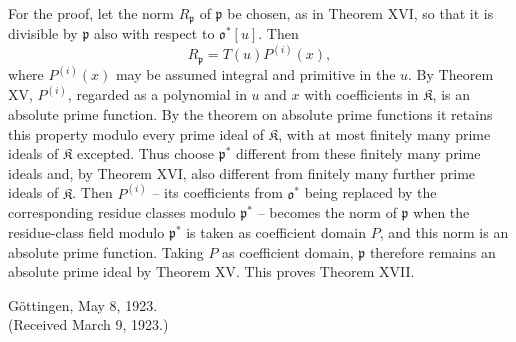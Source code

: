\documentclass[11pt]{article}
\providecommand{\frakp}{\mathfrak p}
\begin{document}
For the proof, let the norm $R_\frakp$ of $\frakp$ be chosen, as in Theorem XVI, so that it is divisible by $\frakp$ also with respect to $\mathfrak o^*[u]$. Then
\[
 R_\frakp=T(u)P^{(i)}(x),
\]
where $P^{(i)}(x)$ may be assumed integral and primitive in the $u$. By Theorem XV, $P^{(i)}$, regarded as a polynomial in $u$ and $x$ with coefficients in $\mathfrak K$, is an absolute prime function. By the theorem on absolute prime functions it retains this property modulo every prime ideal of $\mathfrak K$, with at most finitely many prime ideals of $\mathfrak K$ excepted. Thus choose $\frakp^*$ different from these finitely many prime ideals and, by Theorem XVI, also different from finitely many further prime ideals of $\mathfrak K$. Then $P^{(i)}$ -- its coefficients from $\mathfrak o^*$ being replaced by the corresponding residue classes modulo $\frakp^*$ -- becomes the norm of $\frakp$ when the residue-class field modulo $\frakp^*$ is taken as coefficient domain $P$, and this norm is an absolute prime function. Taking $P$ as coefficient domain, $\frakp$ therefore remains an absolute prime ideal by Theorem XV. This proves Theorem XVII.

\begin{center}
Göttingen, May 8, 1923.\\[1em]
(Received March 9, 1923.)
\end{center}
\end{document}
